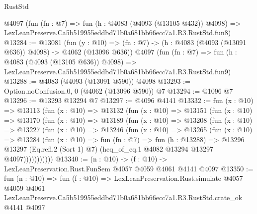 \begin{lexlean}{RustStd}
\begin{coremodule}
    @4097
    (fun (fn : @7) =>
    fun (h : @4083 (@4093 (@13105 @432)) @4098) =>
    LexLeanPreserve.Ca5b519955eddbd71b0a681bb66ecc7a1.R3.RustStd.fun8)
@13284 := @13081
    (fun (y : @10) => (fn : @7) -> (h : @4083 (@4093 (@13091 @636)) @4098) -> @4062 (@13096 @636))
    @4097
    (fun (fn : @7) =>
    fun (h : @4083 (@4093 (@13105 @636)) @4098) =>
    LexLeanPreserve.Ca5b519955eddbd71b0a681bb66ecc7a1.R3.RustStd.fun9)
@13288 := @4083 (@4093 (@13091 @590)) @4098
@13293 := Option.noConfusion.{0, 0} (@4062 (@13096 @590)) @7
@13294 := @1096 @7
@13296 := @13293 @13294 @7
@13297 := @4096 @4141
@13332 := fun (x : @10) =>
  @13113
    (fun (x : @10) =>
    @13132
      (fun (x : @10) =>
      @13151
        (fun (x : @10) =>
        @13170
          (fun (x : @10) =>
          @13189
            (fun (x : @10) =>
            @13208
              (fun (x : @10) =>
              @13227
                (fun (x : @10) =>
                @13246
                  (fun (x : @10) =>
                  @13265
                    (fun (x : @10) =>
                    @13284
                      (fun (x : @10) =>
                      fun (fn : @7) =>
                      fun (h : @13288) =>
                      @13296
                        @13297
                        (Eq.refl.{2} (Sort 1) @7)
                        (heq_of_eq.{1} @4082 @13294 @13297 @4097)))))))))))
@13340 := (n : @10) -> (f : @10) -> LexLeanPreservation.Rust.FunSem @4057 @4059 @4061 @4141 @4097
@13350 := fun (n : @10) =>
  fun (f : @10) =>
  LexLeanPreservation.Rust.simulate
    @4057
    @4059
    @4061
    LexLeanPreserve.Ca5b519955eddbd71b0a681bb66ecc7a1.R3.RustStd.crate_ok
    @4141
    @4097
\end{coremodule}
\end{lexlean}
